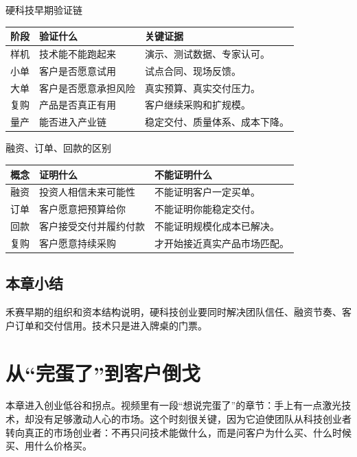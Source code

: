 \documentclass[a4paper]{article}
\begin{document}
\begin{knowledgebox}{硬科技早期验证链}
\begin{tabularx}{\textwidth}{p{}p{}X}
\toprule
阶段 & 验证什么 & 关键证据 \\
\midrule
样机 & 技术能不能跑起来 & 演示、测试数据、专家认可。 \\
小单 & 客户是否愿意试用 & 试点合同、现场反馈。 \\
大单 & 客户是否愿意承担风险 & 真实预算、真实交付压力。 \\
复购 & 产品是否真正有用 & 客户继续采购和扩规模。 \\
量产 & 能否进入产业链 & 稳定交付、质量体系、成本下降。 \\
\bottomrule
\end{tabularx}
\end{knowledgebox}

\begin{knowledgebox}{融资、订单、回款的区别}
\begin{tabularx}{\textwidth}{p{}p{}X}
\toprule
概念 & 证明什么 & 不能证明什么 \\
\midrule
融资 & 投资人相信未来可能性 & 不能证明客户一定买单。 \\
订单 & 客户愿意把预算给你 & 不能证明你能稳定交付。 \\
回款 & 客户接受交付并履约付款 & 不能证明规模化成本已解决。 \\
复购 & 客户愿意持续采购 & 才开始接近真实产品市场匹配。 \\
\bottomrule
\end{tabularx}
\end{knowledgebox}

\subsection{本章小结}

禾赛早期的组织和资本结构说明，硬科技创业要同时解决团队信任、融资节奏、客户订单和交付信用。技术只是进入牌桌的门票。

\section{从“完蛋了”到客户倒戈}

本章进入创业低谷和拐点。视频里有一段“想说完蛋了”的章节：手上有一点激光技术，却没有足够激动人心的市场。这个时刻很关键，因为它迫使团队从科技创业者转向真正的市场创业者：不再只问技术能做什么，而是问客户为什么买、什么时候买、用什么价格买。
\end{document}
